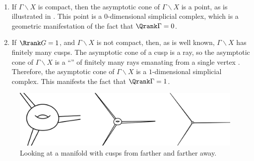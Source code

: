 \begin{egs} \  \label{TanConeEgs}
\noprelistbreak
 \begin{enumerate}
 \item If $\Gamma \backslash X$ is compact, then the
asymptotic cone of $\Gamma \backslash X$ is a
point, as is illustrated in . This point is a $0$-dimensional simplicial
complex, which is a geometric manifestation of the
fact that $\Qrank\Gamma = 0$.
 \item \label{TanConeEgs-rank1} 
If $\Rrank G = 1$, and $\Gamma \backslash X$
is not compact, then, as is well known, $\Gamma \backslash X$ has
finitely many cusps. The asymptotic cone of a cusp
is a ray, so the asymptotic cone of $\Gamma
\backslash X$ is a ``'' of finitely many rays emanating
from a single vertex . Therefore, the asymptotic cone
of $\Gamma \backslash X$ is a $1$-dimensional simplicial
complex. This manifests the fact that $\Qrank\Gamma = 1$.
 \end{enumerate}
 \end{egs}

\begin{figure}[h]
 \centerline{\includegraphics{PDF/shrinkcusps.jpg}}
 \caption{Looking at a manifold with cusps from farther and farther
away.}
 \label{shrinkcusps}
 \end{figure}
%
%
%
%
%
%
%

